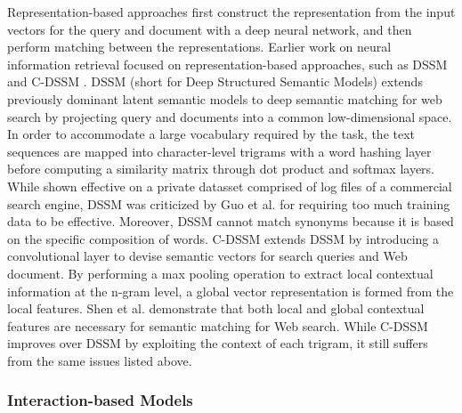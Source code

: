 Representation-based approaches first construct the representation from the input vectors for the query and document with a deep neural network, and then perform matching between the representations.
Earlier work on neural information retrieval focused on representation-based approaches, such as DSSM \cite{huang2013learning} and C-DSSM \cite{shen2014learning}.
DSSM (short for Deep Structured Semantic Models) \cite{huang2013learning} extends previously dominant latent semantic models  to deep semantic matching for web search by projecting query and documents into a common low-dimensional space.
In order to accommodate a large vocabulary required by the task, the text sequences are mapped into character-level trigrams with a word hashing layer before computing a similarity matrix through dot product and softmax layers.
While shown effective on a private datasset comprised of log files of a commercial search engine, DSSM was criticized by Guo et al. \cite{guo2017drmm} for requiring too much training data to be effective.
Moreover, DSSM cannot match synonyms because it is based on the specific composition of words.
C-DSSM \cite{shen2014learning} extends DSSM by introducing a convolutional layer to devise semantic vectors for search queries and Web document.
By performing a max pooling operation to extract local contextual information at the n-gram level, a global vector representation is formed from the local features.
Shen et al. \cite{shen2014learning} demonstrate that both local and global contextual features are necessary for semantic matching for Web search.
While C-DSSM improves over DSSM by exploiting the context of each trigram, it still suffers from the same issues listed above.

\subsubsection{Interaction-based Models}

